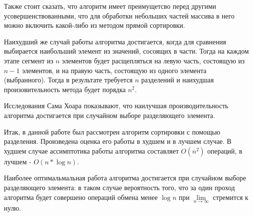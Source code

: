 \documentclass[bachelor, och, labwork]{shiza}
\begin{document}
Также стоит сказать, что алгоритм имеет преимущетсво перед другими
усовершенствованными, что для обработки небольших частей массива в него можно 
включить какой-либо из методом прямой сортировки.

Наихудший же случай работы алгоритма достигается, когда для сравнения выбирается
наибольший элемент из значений, сосоящих в части. Тогда на каждом этапе сегмент 
из $n$ элементов будет расщепляться на левую часть, состоящую из $n-1$ элементов,
и на правую часть, состоящую из одного элемента (выбранного). Тогда в результате
требуется $n$ разделений и наихудшая произовительность метода будет порядка 
$n^2$. 

Исследования Сама Хоара показывают, что наилучшая производительность алгоритма
достигается при случайном выборе разделяющего элемента.

\conclusion

Итак, в данной работе был рассмотрен алгоритм сортировки с помощью разделения.
Произведена оценка его работы в худшем и в лучшем случае. В худшем случае
ассимптотика работы алгоритма составляет $O(n^2)$ операций, 
в лучшем - $O(n*\log n)$.

Наиболее оптимальмальная работа алгоритма достигается при случайном выборе
разделяющего элемента: в таком случае вероятность того, что за один проход
алгоритма будет совершено операций обмена менее $\log n$ при 
$\lim\limits_{n\rightarrow\infty }$ стремится к нулю.
\end{document}
